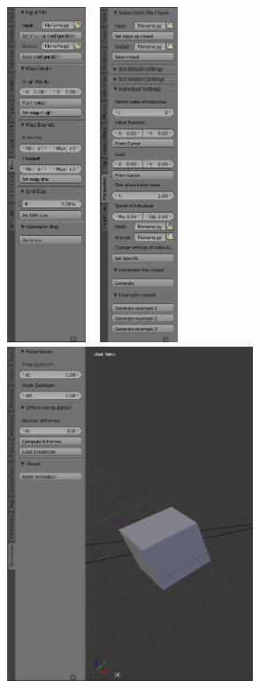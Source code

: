 \begin{figure}
  \centering
\includegraphics[height=10cm]{img/GUI_map_example.png} ~ 
\includegraphics[height=10cm]{img/GUI_crowd_example.png} ~ 
\includegraphics[height=10cm]{img/GUI_simulation_example.png}
\end{figure}
